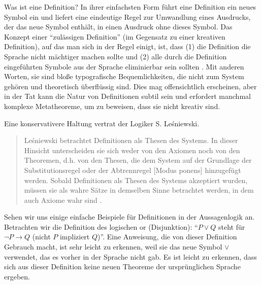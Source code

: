 Was ist eine Definition?  In ihrer einfachsten Form führt eine Definition ein neues Symbol ein und liefert eine eindeutige Regel zur Umwandlung eines Ausdrucks, der das neue Symbol enthält, in einen Ausdruck ohne dieses Symbol.  Das Konzept einer "`zulässigen Definition"' (im Gegensatz zu einer kreativen Definition), auf das man sich in der Regel einigt, ist, dass (1) die Definition die Sprache nicht mächtiger machen sollte und (2) alle durch die Definition eingeführten Symbole aus der Sprache eliminierbar sein sollten \cite{Nemesszeghy}.  Mit anderen Worten, sie sind bloße typografische Bequemlichkeiten, die nicht zum System gehören und theoretisch überflüssig sind.  Dies mag offensichtlich erscheinen, aber in der Tat kann die Natur von Definitionen subtil sein und erfordert manchmal komplexe Metatheoreme, um zu beweisen, dass sie nicht kreativ sind.

Eine konservativere Haltung vertrat der Logiker S. Le\'{s}niewski.
\begin{quote}
  Le\'{s}niewski betrachtet Definitionen als Thesen des Systems.  In dieser Hinsicht unterscheiden sie sich weder von den Axiomen noch von den Theoremen, d.h. von den Thesen, die dem System auf der Grundlage der Substitutionsregel oder der Abtrennregel [Modus ponens] hinzugefügt werden.  Sobald Definitionen als Thesen des Systems akzeptiert wurden, müssen sie als wahre Sätze in demselben Sinne betrachtet werden, in dem auch Axiome wahr sind
  \cite{Lejewski}.
\end{quote}

Sehen wir uns einige einfache Beispiele für Definitionen in der Aussagenlogik an.  Betrachten wir die Definition des logischen {\sc or} (Disjunktion): "`$P\vee Q$ steht für $\neg P \rightarrow Q$ (nicht $P$ impliziert $Q$)"'.  Eine Anweisung, die von dieser Definition Gebrauch macht, ist sehr leicht zu erkennen, weil sie das neue Symbol $\vee$ verwendet, das es vorher in der Sprache nicht gab.  Es ist leicht zu erkennen, dass sich aus dieser Definition keine neuen Theoreme der ursprünglichen Sprache ergeben.

